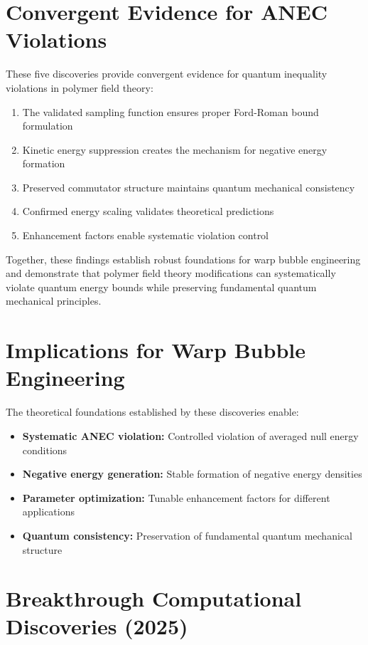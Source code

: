 \documentclass[11pt]{article}
\begin{document}
\section{Convergent Evidence for ANEC Violations}

These five discoveries provide convergent evidence for quantum inequality violations in polymer field theory:

\begin{enumerate}
    \item The validated sampling function ensures proper Ford-Roman bound formulation
    \item Kinetic energy suppression creates the mechanism for negative energy formation
    \item Preserved commutator structure maintains quantum mechanical consistency
    \item Confirmed energy scaling validates theoretical predictions
    \item Enhancement factors enable systematic violation control
\end{enumerate}

Together, these findings establish robust foundations for warp bubble engineering and demonstrate that polymer field theory modifications can systematically violate quantum energy bounds while preserving fundamental quantum mechanical principles.

\section{Implications for Warp Bubble Engineering}

The theoretical foundations established by these discoveries enable:

\begin{itemize}
    \item \textbf{Systematic ANEC violation:} Controlled violation of averaged null energy conditions
    \item \textbf{Negative energy generation:} Stable formation of negative energy densities
    \item \textbf{Parameter optimization:} Tunable enhancement factors for different applications
    \item \textbf{Quantum consistency:} Preservation of fundamental quantum mechanical structure
\end{itemize}

\section{Breakthrough Computational Discoveries (2025)}
\end{document}

